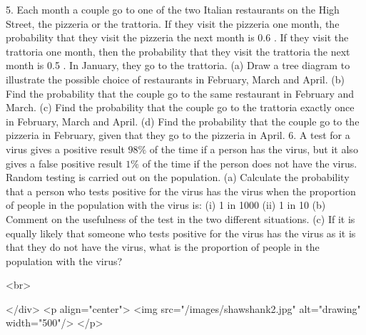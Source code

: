 5. Each month a couple go to one of the two Italian restaurants on the High Street, the pizzeria or the trattoria. If they visit the pizzeria one month, the probability that they visit the pizzeria the next month is 0.6 . If they visit the trattoria one month, then the probability that they visit the trattoria the next month is 0.5 . In January, they go to the trattoria.
(a) Draw a tree diagram to illustrate the possible choice of restaurants in February, March and April.
(b) Find the probability that the couple go to the same restaurant in February and March.
(c) Find the probability that the couple go to the trattoria exactly once in February, March and April.
(d) Find the probability that the couple go to the pizzeria in February, given that they go to the pizzeria in April.
6. A test for a virus gives a positive result $98 \%$ of the time if a person has the virus, but it also gives a false positive result $1 \%$ of the time if the person does not have the virus. Random testing is carried out on the population.
(a) Calculate the probability that a person who tests positive for the virus has the virus when the proportion of people in the population with the virus is:
(i) 1 in 1000
(ii) 1 in 10
(b) Comment on the usefulness of the test in the two different situations.
(c) If it is equally likely that someone who tests positive for the virus has the virus as it is that they do not have the virus, what is the proportion of people in the population with the virus?

<br>

</div>
<p align="center">
<img src="/images/shawshank2.jpg" alt="drawing" width="500"/>
</p>
